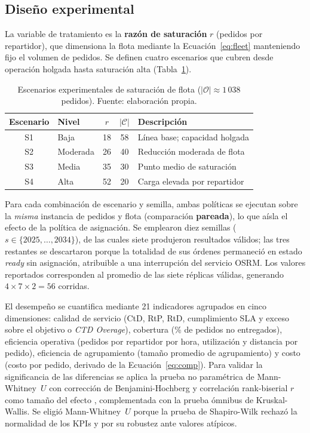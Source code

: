 \documentclass[12pt,letterpaper]{article}
\begin{document}
\subsection{Diseño experimental}

La variable de tratamiento es la \textbf{razón de saturación} $r$ (pedidos por
repartidor), que dimensiona la flota mediante la Ecuación~\eqref{eq:fleet}
manteniendo fijo el volumen de pedidos. Se definen cuatro escenarios que cubren
desde operación holgada hasta saturación alta (Tabla~\ref{tab:escenarios}).

\begin{table}[htbp]
\centering
\caption{Escenarios experimentales de saturación de flota ($|\mathcal{O}|\approx
1\,038$ pedidos). Fuente: elaboración propia.}
\label{tab:escenarios}
\begin{tabular}{@{}clccl@{}}
\toprule
Escenario & Nivel & $r$ & $|\mathcal{C}|$ & Descripción \\
\midrule
S1 & Baja     & 18 & 58 & Línea base; capacidad holgada \\
S2 & Moderada & 26 & 40 & Reducción moderada de flota \\
S3 & Media    & 35 & 30 & Punto medio de saturación \\
S4 & Alta     & 52 & 20 & Carga elevada por repartidor \\
\bottomrule
\end{tabular}
\end{table}

Para cada combinación de escenario y semilla, ambas políticas se ejecutan sobre la
\emph{misma} instancia de pedidos y flota (comparación \textbf{pareada}), lo que
aísla el efecto de la política de asignación. Se emplearon diez semillas
($s\in\{2025,\ldots,2034\}$), de las cuales siete produjeron resultados válidos;
las tres restantes se descartaron porque la totalidad de sus órdenes permaneció en
estado \emph{ready} sin asignación, atribuible a una interrupción del servicio
OSRM. Los valores reportados corresponden al promedio de las siete réplicas
válidas, generando $4\times 7\times 2 = 56$ corridas.

El desempeño se cuantifica mediante 21 indicadores agrupados en cinco dimensiones:
calidad de servicio (CtD, RtP, RtD, cumplimiento SLA y exceso sobre el objetivo o
\textit{CTD Overage}), cobertura (\% de pedidos no entregados), eficiencia
operativa (pedidos por repartidor por hora, utilización y distancia por pedido),
eficiencia de agrupamiento (tamaño promedio de agrupamiento) y costo (costo por
pedido, derivado de la Ecuación~\ref{eq:comp}). Para validar la significancia de
las diferencias se aplica la prueba no paramétrica de Mann-Whitney~$U$
\citep{MannWhitney1947} con corrección de Benjamini-Hochberg y correlación
rank-biserial $r$ como tamaño del efecto \citep{Cohen1988}, complementada con la
prueba ómnibus de Kruskal-Wallis. Se eligió Mann-Whitney~$U$ porque la prueba de
Shapiro-Wilk rechazó la normalidad de los KPIs y por su robustez ante valores
atípicos.
\end{document}

